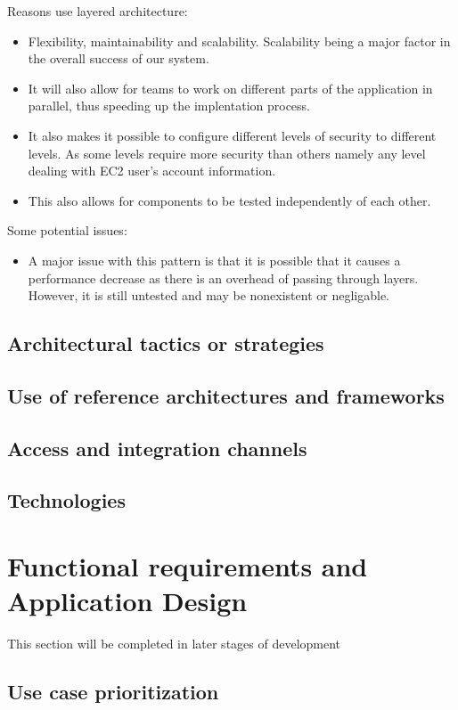 \documentclass[a4paper,12pt]{report}
\begin{document}
		Reasons use layered architecture:
		\begin{itemize}
			\item Flexibility, maintainability and scalability. Scalability being a major factor in the overall success of our system. 
			\item It will also allow for teams to work on different parts of the application in parallel, thus speeding up the implentation process. 
			\item It also makes it possible to configure different levels of security to different levels. As some levels require more security than others namely any level dealing with EC2 user's account information.
			\item This also allows for components to be tested independently of each other. 
		\end{itemize}
		
		Some potential issues:
		\begin{itemize}
			\item A major issue with this pattern is that it is possible that it causes a performance decrease as there is an overhead of passing through layers. However, it is still untested and may be nonexistent or negligable.
		\end{itemize}
	\subsection{Architectural tactics or strategies}
	\subsection{Use of reference architectures and frameworks}
	\subsection{Access and integration channels}
	\subsection{Technologies}
\section{Functional requirements and Application Design}
	This section will be completed in later stages of development
	\subsection{Use case prioritization}
\end{document}
